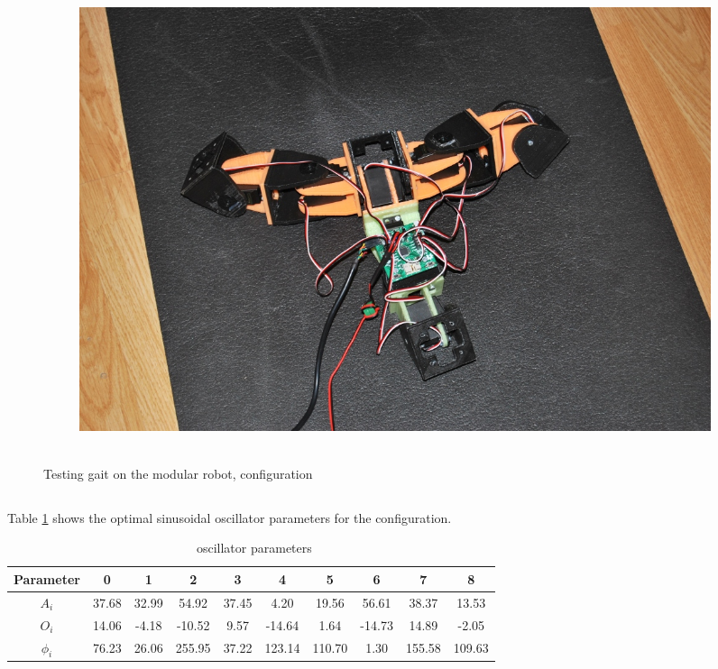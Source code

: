 \begin{figure}[h]
\begin{subfigure}[b]{0.31\textwidth}
                \includegraphics[width=\textwidth]{images/results_7_real_gait_03.jpg}
                 \\~
        \end{subfigure}
        \caption{Testing gait on the modular robot, \robotSeven configuration}
        \label{fig:result_7_real}
\end{figure}


\subsection{\robotNine}
Table \ref{table:robot_9_parameters} shows the optimal sinusoidal oscillator parameters for the \robotNine configuration.\\

\begin{table}[H]
\centering
\begin{tabular}{|c||c|c|c|c|c|c|c|c|c|} \hline
Parameter & 0 & 1 & 2 & 3 & 4 & 5 & 6 & 7 & 8 \\ \hline
\hline $A_i$ & 37.68 & 32.99 & 54.92 & 37.45 & 4.20 & 19.56 & 56.61 & 38.37 & 13.53 \\ 
\hline $O_i$ & 14.06 & -4.18 & -10.52 & 9.57 & -14.64 & 1.64 & -14.73 & 14.89 & -2.05 \\ 
\hline $\phi_i$ & 76.23 & 26.06 & 255.95 & 37.22 & 123.14 & 110.70 & 1.30 & 155.58 & 109.63 \\ 
\hline 
\end{tabular}
\caption{\robotNine ~oscillator parameters}
\label{table:robot_9_parameters}
\end{table}

